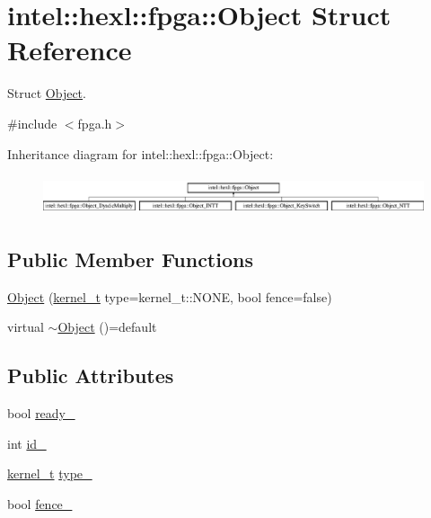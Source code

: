 \hypertarget{structintel_1_1hexl_1_1fpga_1_1Object}{\section{intel\-:\-:hexl\-:\-:fpga\-:\-:Object Struct Reference}
\label{structintel_1_1hexl_1_1fpga_1_1Object}
}


Struct \hyperlink{structintel_1_1hexl_1_1fpga_1_1Object}{Object}.  




{\ttfamily \#include $<$fpga.\-h$>$}

Inheritance diagram for intel\-:\-:hexl\-:\-:fpga\-:\-:Object\-:\begin{figure}[H]
\begin{center}
\leavevmode
\includegraphics[height=1.181435cm]{structintel_1_1hexl_1_1fpga_1_1Object}
\end{center}
\end{figure}
\subsection*{Public Member Functions}
\begin{DoxyCompactItemize}
\item 
\hyperlink{structintel_1_1hexl_1_1fpga_1_1Object_afbecbde0e8e9f2e4b87326d164d2f3a6}{Object} (\hyperlink{namespaceintel_1_1hexl_1_1fpga_a9f07798cd59a71b9f57156192f7bf2f6}{kernel\-\_\-t} type=kernel\-\_\-t\-::\-N\-O\-N\-E, bool fence=false)
\item 
virtual \hyperlink{structintel_1_1hexl_1_1fpga_1_1Object_a53dd49a3d2fe50a55d91eda3f139e04f}{$\sim$\-Object} ()=default
\end{DoxyCompactItemize}
\subsection*{Public Attributes}
\begin{DoxyCompactItemize}
\item 
bool \hyperlink{structintel_1_1hexl_1_1fpga_1_1Object_a8d6495f3b68194f0c38927d76e9c652c}{ready\-\_\-}
\item 
int \hyperlink{structintel_1_1hexl_1_1fpga_1_1Object_ade9313d87b44bc1bfeccca2f5829ceae}{id\-\_\-}
\item 
\hyperlink{namespaceintel_1_1hexl_1_1fpga_a9f07798cd59a71b9f57156192f7bf2f6}{kernel\-\_\-t} \hyperlink{structintel_1_1hexl_1_1fpga_1_1Object_a795a35540ad7bb347d3978ca83f72e8b}{type\-\_\-}
\item 
bool \hyperlink{structintel_1_1hexl_1_1fpga_1_1Object_a187c9e1d3e7dca831390d438cee83b13}{fence\-\_\-}
\end{DoxyCompactItemize}
